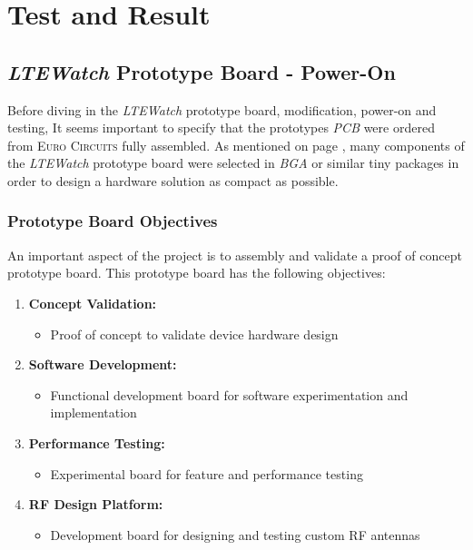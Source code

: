 \documentclass[Report.tex]{subfiles}
\begin{document}
\chapter{Test and Result}

\section{\textit{LTEWatch} Prototype Board - Power-On}

Before diving in the \textit{LTEWatch} prototype board, modification, power-on and testing, It seems important to specify that the prototypes \textit{PCB} were ordered from \textsc{Euro Circuits} fully assembled. As mentioned on page \pageref{sec:comp_size_select}, many components of the \textit{LTEWatch} prototype board were selected in \textit{BGA} or similar tiny packages in order to design a hardware solution as compact as possible.

\subsection{Prototype Board Objectives}
An important aspect of the project is to assembly and validate a proof of concept prototype board. This prototype board has the following objectives:

\begin{enumerate}
\item \textbf{Concept Validation:}
\begin{itemize}
\item Proof of concept to validate device hardware design
\end{itemize}
\item \textbf{Software Development:} 
\begin{itemize}
\item Functional development board for software experimentation and implementation
\end{itemize}
\item \textbf{Performance Testing:} 
\begin{itemize}
\item Experimental board for feature and performance testing
\end{itemize}
\item \textbf{RF Design Platform:}
\begin{itemize}
\item Development board for designing and testing custom RF antennas
\end{itemize}
\end{enumerate}
\end{document}
